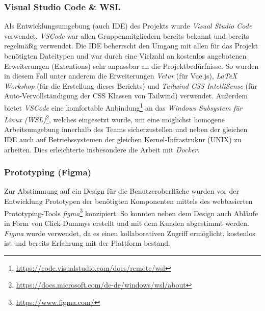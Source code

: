 \documentclass[10pt, a4paper]{article}
\begin{document}
\begin{onehalfspace}
      \subsubsection{Visual Studio Code \& WSL}
      Als Entwicklungsumgebung (auch IDE) des Projekts wurde \textit{Visual Studio Code} verwendet. \textit{VSCode} war allen Gruppenmitgliedern bereits bekannt und bereits regelmäßig verwendet.
      Die IDE beherrscht den Umgang mit allen für das Projekt benötigten Dateitypen und war durch eine Vielzahl an kostenlos angebotenen Erweiterungen (Extentions) sehr anpassbar an die Projektbedürfnisse.
      So wurden in diesem Fall unter anderem die Erweiterungen \textit{Vetur} (für Vue.js), \textit{LaTeX Workshop}  (für die Erstellung dieses Berichts) und \textit{Tailwind CSS IntelliSense} (für Auto-Vervollständigung der CSS Klassen von Tailwind) verwendet.
      Außerdem bietet \textit{VSCode} eine komfortable Anbindung\footnote{\raggedright\url{https://code.visualstudio.com/docs/remote/wsl}} an das
      \textit{Windows Subsystem für Linux (WSL)}\footnote{\raggedright\url{https://docs.microsoft.com/de-de/windows/wsl/about}}, welches eingesetzt wurde, um eine möglichst homogene Arbeitsumgebung innerhalb des Teams sicherzustellen
      und neben der gleichen IDE auch auf Betriebssystemen der gleichen Kernel-Infrastrukur (UNIX) zu arbeiten. Dies erleichterte insbesondere die Arbeit mit \textit{Docker}.

      \subsubsection{Prototyping (Figma)}
      \label{figma}
      Zur Abstimmung auf ein Design für die Benutzer\-oberfläche wurden vor der Entwicklung Proto\-typen der benötigten Komponenten mittels des webbasierten
      Prototyping-Tools \textit{figma}\footnote{\url{https://www.figma.com/}} konzipiert. So konnten neben dem Design auch Abläufe in Form von \glqq Click-Dummys\grqq{} erstellt und mit dem Kunden abgestimmt werden.
      \textit{Figma} wurde verwendet, da es einen kollaborativen Zugriff ermöglicht, kostenlos ist und bereits Erfahrung mit der Plattform bestand.


\end{onehalfspace}
\end{document}
